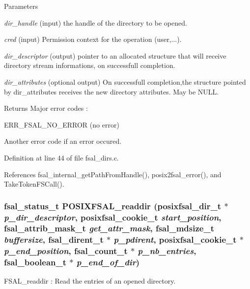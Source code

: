 \begin{DoxyParams}{Parameters}
\item[{\em dir\_\-handle}](input) the handle of the directory to be opened. \item[{\em cred}](input) Permission context for the operation (user,...). \item[{\em dir\_\-descriptor}](output) pointer to an allocated structure that will receive directory stream informations, on successfull completion. \item[{\em dir\_\-attributes}](optional output) On successfull completion,the structure pointed by dir\_\-attributes receives the new directory attributes. May be NULL.\end{DoxyParams}
\begin{DoxyReturn}{Returns}
Major error codes :
\begin{DoxyItemize}
\item ERR\_\-FSAL\_\-NO\_\-ERROR (no error)
\item Another error code if an error occured. 
\end{DoxyItemize}
\end{DoxyReturn}


Definition at line 44 of file fsal\_\-dirs.c.

References fsal\_\-internal\_\-getPathFromHandle(), posix2fsal\_\-error(), and TakeTokenFSCall().
\subsubsection[{POSIXFSAL\_\-readdir}]{\setlength{\rightskip}{0pt plus 5cm}fsal\_\-status\_\-t POSIXFSAL\_\-readdir (posixfsal\_\-dir\_\-t $\ast$ {\em p\_\-dir\_\-descriptor}, \/  posixfsal\_\-cookie\_\-t {\em start\_\-position}, \/  fsal\_\-attrib\_\-mask\_\-t {\em get\_\-attr\_\-mask}, \/  fsal\_\-mdsize\_\-t {\em buffersize}, \/  fsal\_\-dirent\_\-t $\ast$ {\em p\_\-pdirent}, \/  posixfsal\_\-cookie\_\-t $\ast$ {\em p\_\-end\_\-position}, \/  fsal\_\-count\_\-t $\ast$ {\em p\_\-nb\_\-entries}, \/  fsal\_\-boolean\_\-t $\ast$ {\em p\_\-end\_\-of\_\-dir})}\label{fsal__dirs_8c_a2828071d036ab63c6cd74e2c9110e0b6}
FSAL\_\-readdir : Read the entries of an opened directory.


